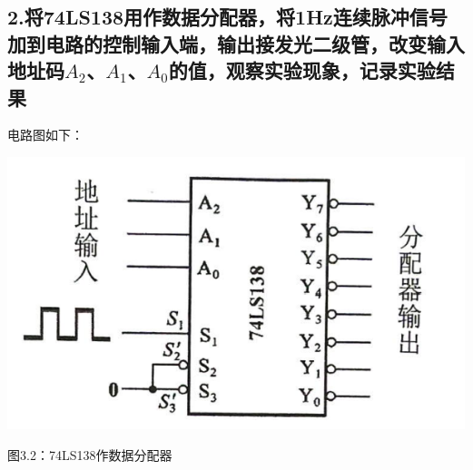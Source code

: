 \documentclass{ctexart}
\begin{document}
    \subsection*{2.将74LS138用作数据分配器，将1Hz连续脉冲信号加到电路的控制输入端，输出接发光二级管，改变输入地址码$A_2$、$A_1$、$A_0$的值，观察实验现象，记录实验结果}

     电路图如下：

    \begin{minipage}[l]{\textwidth}
        \centering 
        \includegraphics[width=0.7\linewidth]{3.2.png} 
        
        图3.2：74LS138作数据分配器
    \end{minipage}
\end{document}

